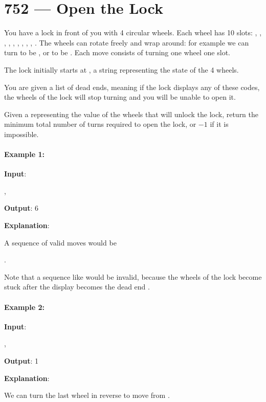 \section{752 --- Open the Lock}
You have a lock in front of you with 4 circular wheels. Each wheel has 10 slots: , , , , , , , , , . The wheels can rotate freely and wrap around: for example we can turn  to be , or  to be . Each move consists of turning one wheel one slot.

The lock initially starts at , a string representing the state of the 4 wheels.

You are given a list of  dead ends, meaning if the lock displays any of these codes, the wheels of the lock will stop turning and you will be unable to open it.

Given a  representing the value of the wheels that will unlock the lock, return the minimum total number of turns required to open the lock, or $-1$ if it is impossible.

\paragraph{Example 1:}
\begin{flushleft}


\textbf{Input}: 

, 

\textbf{Output}: 6

\textbf{Explanation}:

A sequence of valid moves would be 

.

Note that a sequence like  would be invalid, because the wheels of the lock become stuck after the display becomes the dead end .

\end{flushleft}

\paragraph{Example 2:}

\begin{flushleft}
\textbf{Input}: 

, 

\textbf{Output}: 1

\textbf{Explanation}:

We can turn the last wheel in reverse to move from .
\end{flushleft}

